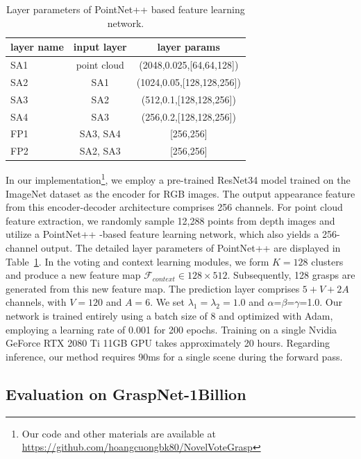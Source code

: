 \begin{table}[h]
\caption{Layer parameters of PointNet++ \cite{qi2017pointnet++} based feature learning network.}
\label{tab:layer_specs}
\begin{center}
\begin{tabular}{|l|c|c|}
\hline
layer name & input layer & layer params \\
\hline
SA1 & point cloud & (2048,0.025,[64,64,128]) \\
SA2 & SA1  & (1024,0.05,[128,128,256]) \\
SA3 & SA2 & (512,0.1,[128,128,256]) \\
SA4 & SA3 & (256,0.2,[128,128,256]) \\
FP1 & SA3, SA4 & [256,256] \\ 
FP2 & SA2, SA3 & [256,256] \\
\hline
\end{tabular}
\end{center}
\end{table}

In our implementation\footnote{Our code and other materials are available at \url{https://github.com/hoangcuongbk80/NovelVoteGrasp}}, we employ a pre-trained ResNet34 model trained on the ImageNet dataset as the encoder for RGB images. The output appearance feature from this encoder-decoder architecture comprises 256 channels. For point cloud feature extraction, we randomly sample 12,288 points from depth images and utilize a PointNet++ \cite{qi2017pointnet++}-based feature learning network, which also yields a 256-channel output. The detailed layer parameters of PointNet++ \cite{qi2017pointnet++} are displayed in Table~\ref{tab:layer_specs}. In the voting and context learning modules, we form $K=128$ clusters and produce a new feature map $\mathcal{F}_{context} \in 128 \times 512$. Subsequently, 128 grasps are generated from this new feature map. The prediction layer comprises $5 + V + 2A$ channels, with $V=120$ and $A=6$. We set $\lambda_{1}=\lambda_{2}=1.0$ and $\alpha$=$\beta$=$\gamma$=1.0. Our network is trained entirely using a batch size of 8 and optimized with Adam, employing a learning rate of 0.001 for 200 epochs. Training on a single Nvidia GeForce RTX 2080 Ti 11GB GPU takes approximately 20 hours. Regarding inference, our method requires 90ms for a single scene during the forward pass.

\subsection{Evaluation on GraspNet-1Billion}

